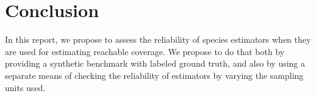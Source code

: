 \documentclass[conference,anonymous,review]{IEEEtran}
\begin{document}
\section{Conclusion}
\label{sec:conclusion}
In this report, we propose to assess the reliability of species estimators when
they are used for estimating reachable coverage. We propose to do that both by
providing a synthetic benchmark with labeled ground truth, and also by
using a separate means of checking the reliability of estimators by varying
the sampling units used.

\balance


\end{document}
